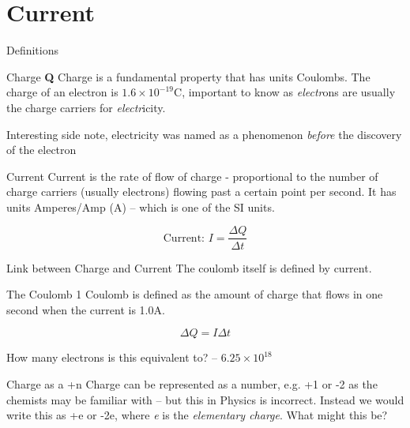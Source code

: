 \documentclass[../Main.tex]{subfiles}
\begin{document}
\author{Current} %
\date{Year 1 Topic 12} %

\section{Current} %

\begin{frame}{Definitions}
    \begin{block}{Charge \textbf{Q}}
    Charge is a fundamental property that has units Coulombs. The charge of an electron is $1.6\times10^{-19}$C, important to know as \emph{electr}ons are usually the charge carriers for \emph{electr}icity.
    \end{block}
    {\small Interesting side note, electricity was named as a phenomenon \emph{before} the discovery of the electron}
    \pause
    \begin{block}{Current}
    Current is the rate of flow of charge - proportional to the number of charge carriers (usually electrons) flowing past a certain point per second. It has units Amperes/Amp (A) -- which is one of the SI units. \newline 
    \end{block}
    \pause
    \begin{equation*}
       \mbox{Current: } I = \frac{\Delta Q}{\Delta t}
    \end{equation*}
\end{frame}

\begin{frame}{Link between Charge and Current}
    The coulomb itself is defined by current. 
    \begin{block}{The Coulomb}
    1 Coulomb is defined as the amount of charge that flows in one second when the current is 1.0A.
    \end{block}
    
    {\large
    \begin{equation*}
        \Delta Q=I\Delta t
    \end{equation*}}
    
    How many electrons is this equivalent to? \pause
    -- $6.25\times 10^{18}$
    \pause
    \begin{block}{Charge as a +n}
    Charge can be represented as a number, e.g. +1 or -2 as the chemists may be familiar with -- but this in Physics is incorrect. Instead we would write this as +e or -2e, where \emph{e} is the \emph{elementary charge}. What might this be?
    \end{block}
\end{frame}
\end{document}
